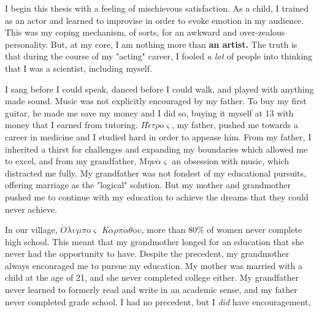 \documentclass[12pt]{ucsddissertation}
\begin{document}
{\begin{tabular}{@{}l l}
\end{tabular}

\bigskip %


}

\listoffigures
\listofscheme
\listoftables


\begin{preface}
I begin this thesis with a feeling of mischievous satisfaction. As a child, I trained as an actor and learned to improvise in order to evoke emotion in my audience. This was my coping mechanism, of sorts, for an awkward and over-zealous personality. But, at my core, I am nothing more than \textbf{an artist.} The truth is that during the course of my "acting" career, I fooled \textit{a lot} of people into thinking that I was a scientist, including myself. 

I sang before I could speak, danced before I could walk, and played with anything made sound. Music was not explicitly encouraged by my father. To buy my first guitar, he made me save my money and I did so, buying it myself at 13 with money that I earned from tutoring.  $\Pi\acute{\epsilon}\tau\rho$o$\varsigma$, my father, pushed me towards a career in medicine and I studied hard in order to appease him. From my father, I inherited a thirst for challenges and expanding my boundaries which allowed me to excel, and from my grandfather, M$\eta\nu\acute{\alpha}\varsigma$ an obsession with music, which distracted me fully. My grandfather was not fondest of my educational pursuits, offering marriage as the "logical" solution. But my mother and grandmother pushed me to continue with my education to achieve the dreams that they could never achieve. 

In our village, $\acute{O}\lambda\upsilon\mu\pi$o$\varsigma$ \textit{K}$\alpha\rho\pi\acute{\alpha}\theta$o$\upsilon$, more than 80\% of women never complete high school. This meant that my grandmother longed for an education that she never had the opportunity to have. Despite the precedent, my grandmother always encouraged me to pursue my education. My mother was married with a child at the age of 21, and she never completed college either. My grandfather never learned to formerly read and write in an academic sense, and my father never completed grade school. I had no precedent, but I \textit{did} have encouragement,  


\end{preface}
\end{document}
